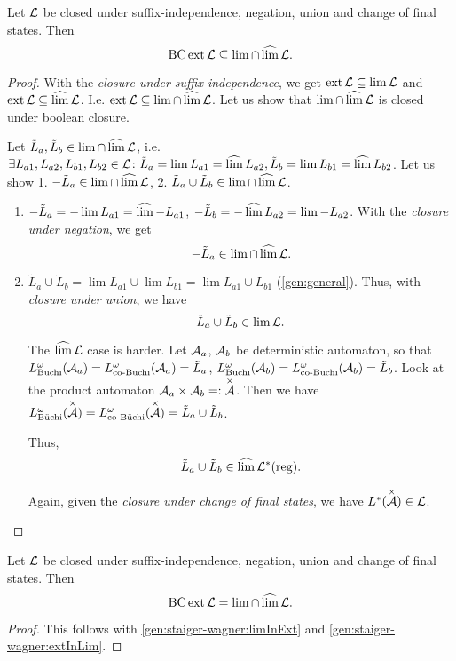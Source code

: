 \begin{theorem}
\label{gen:staiger-wagner:extInLim}
Let $\mathcal{L}$ be closed under suffix-independence, negation, union and change of final states. Then
\[ \operatorname{BC} \operatorname{ext} \mathcal{L} \subseteq \lim \cap \operatorname{\widehat{lim}} \mathcal{L} . \]
\begin{proof}
With the \emph{closure under suffix-independence}, we get $\operatorname{ext} \mathcal{L} \subseteq \lim \mathcal{L}$ and $\operatorname{ext} \mathcal{L} \subseteq \operatorname{\widehat{lim}} \mathcal{L}$. I.e. $\operatorname{ext} \mathcal{L} \subseteq \lim \cap \operatorname{\widehat{lim}} \mathcal{L}$. Let us show that $\lim \cap \operatorname{\widehat{lim}} \mathcal{L}$ is closed under boolean closure.

Let $\tilde L_a,\tilde L_b \in \lim \cap \operatorname{\widehat{lim}} \mathcal{L}$, i.e. $\exists L_{a1}, L_{a2}, L_{b1}, L_{b2} \in \mathcal{L} \colon \tilde L_a = \lim L_{a1} = \operatorname{\widehat{lim}} L_{a2}, \tilde L_b = \lim L_{b1} = \operatorname{\widehat{lim}} L_{b2}$. Let us show 1. $-\tilde L_a \in \lim \cap \operatorname{\widehat{lim}} \mathcal{L}$, 2. $\tilde L_a \cup \tilde L_b \in \lim \cap \operatorname{\widehat{lim}} \mathcal{L}$.
\begin{enumerate}
\item $-\tilde L_a = -\lim L_{a1} = \operatorname{\widehat{lim}} -L_{a1}$, $-\tilde L_b = -\operatorname{\widehat{lim}} L_{a2} = \lim -L_{a2}$. With the \emph{closure under negation}, we get
\[ -\tilde L_a \in \lim \cap \operatorname{\widehat{lim}} \mathcal{L} . \]

\item
$\tilde L_a \cup \tilde L_b = \lim L_{a1} \cup \lim L_{b1} = \lim L_{a1} \cup L_{b1}$ (\cref{gen:general}). Thus, with \emph{closure under union}, we have
\[ \tilde L_a \cup \tilde L_b \in \lim \mathcal{L} . \]

The $\operatorname{\widehat{lim}}\mathcal{L}$ case is harder.
Let $\mathcal{A}_a$, $\mathcal{A}_b$ be deterministic automaton, so that $L^\omega_{\text{Büchi}}(\mathcal{A}_a) = L^\omega_{\text{co-Büchi}}(\mathcal{A}_a) = \tilde L_a$, $L^\omega_{\text{Büchi}}(\mathcal{A}_b) = L^\omega_{\text{co-Büchi}}(\mathcal{A}_b) = \tilde L_b$. Look at the product automaton $\mathcal{A}_a \times \mathcal{A}_b =: \overset{\times}{\mathcal{A}}$. Then we have $L^\omega_{\text{Büchi}}(\overset{\times}{\mathcal{A}}) = L^\omega_{\text{co-Büchi}}(\overset{\times}{\mathcal{A}}) = \tilde L_a \cup \tilde L_b$.

Thus,
\[ \tilde L_a \cup \tilde L_b \in \operatorname{\widehat{lim}} \mathcal{L}^*(\textup{\textrm{reg}}) . \]

Again, given the \emph{closure under change of final states}, we have $L^*(\overset{\times}{\mathcal{A}}) \in \mathcal{L}$.
\end{enumerate}
\end{proof}
\end{theorem}

\begin{theorem}
\label{gen:staiger-wagner}
Let $\mathcal{L}$ be closed under suffix-independence, negation, union and change of final states. Then
\[ \operatorname{BC} \operatorname{ext} \mathcal{L} = \lim \cap \operatorname{\widehat{lim}} \mathcal{L} . \]

\begin{proof}
This follows with \cref{gen:staiger-wagner:limInExt} and \cref{gen:staiger-wagner:extInLim}.
\end{proof}
\end{theorem}

